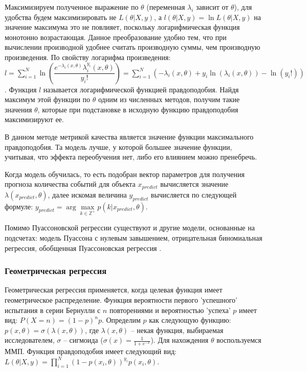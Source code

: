 Максимизируем полученное выражение по $\theta$ (переменная $\lambda_i$ зависит от $\theta$), для удобства будем максимизировать не $L(\theta | X,y)$, а $l(\theta | X,y) = \ln L(\theta | X,y)$ на значение максимума это не повлияет, поскольку логарифмическая функция монотонно возрастающая. Данное преобразование удобно тем, что при вычислении производной удобнее считать производную суммы, чем производную произведения. По свойству логарифма произведения: $l = \sum\limits_{i=1}^{N} \ln \left( \dfrac{e^{-\lambda_i(x, \theta)} \lambda_i^{y_i}(x, \theta)}{y_i!} \right) = \sum\limits_{i=1}^{N} \left( -\lambda_i(x, \theta) + y_i \ln(\lambda_i(x, \theta)) - \ln(y_i!) \right)$. Функция $l$ называется логарифмической функцией правдоподобия. Найдя максимум этой функции по $\theta$ одним из численных методов, получим такие значения $\theta$, которые при подстановке в исходную функцию правдоподобия максимизируют ее.

В данном методе метрикой качества является значение функции максимального правдоподобия. Та модель лучше, у которой большее значение функции, учитывая, что эффекта переобучения нет, либо его влиянием можно пренебречь.

Когда модель обучилась, то есть подобран вектор параметров для получения прогноза количества событий для объекта $x_{predict}$ вычисляется значение $\lambda(x_{predict}, \theta)$, далее искомая величина $y_{predict}$ вычисляется по следующей формуле: $y_{predict} = \arg\max\limits_{k \in \mathbb{Z}^+} p(k | x_{predict}, \theta)$.

Помимо Пуассоновской регрессии существуют и другие модели, основанные на подсчетах: модель Пуассона с нулевым завышением, отрицательная биномиальная регрессия, обобщенная Пуассоновская регрессия \cite{towardsdatascience:poisson_regression}.


\subsubsection{Геометрическая регрессия}

Геометрическая регрессия применяется, когда целевая функция имеет геометрическое распределение. Функция вероятности первого 'успешного' испытания в серии Бернулли с $n$ повторениями и вероятностью 'успеха' $p$ имеет вид: $P(X=n)=(1-p)^{n}p$. Определим $p$ как следующую функцию: $p(x,\theta) = \sigma(\lambda(x,\theta))$, где $\lambda(x, \theta)$ -- некая функция, выбираемая исследователем, $\sigma$ -- сигмоида ($\sigma(x) = \frac{1}{1 + e^{-x}}$). Для нахождения $\theta$ воспользуемся ММП. Функция правдоподобия имеет следующий вид: $L(\theta | X,y) = \prod\limits_{i = 1}^N (1-p(x_i,\theta))^{y_i}p(x_i,\theta)$.

